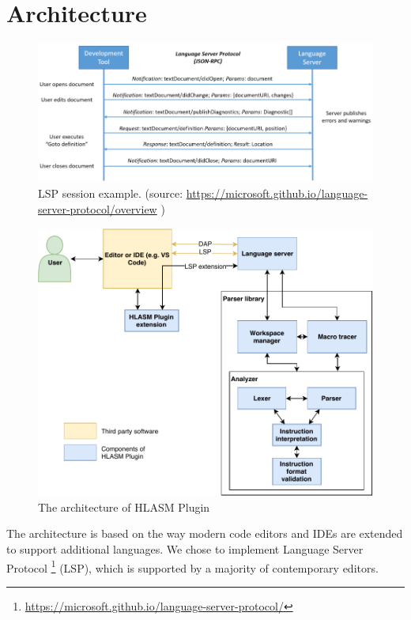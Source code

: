 \chapter{Architecture}
\label{arch}

\begin{figure}
	\centering
	\includegraphics[width=\textwidth]{img/language-server-sequence}
	\caption[LSP session example.]{LSP session example. (source: \url{https://microsoft.github.io/language-server-protocol/overview} )}
	\label{fig04:LSP}
\end{figure}

\begin{figure}
	\centering
	\includegraphics[width=\textwidth]{img/hlasm_architecture}
	\caption{The architecture of HLASM Plugin}
	\label{fig04:arch}
\end{figure}

The architecture is based on the way modern code editors and IDEs are extended to support additional languages. We chose to implement Language Server Protocol \footnote{\url{https://microsoft.github.io/language-server-protocol/}} (LSP), which is supported by a majority of contemporary editors.

